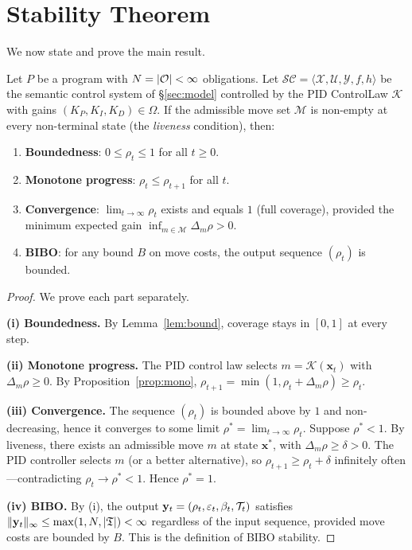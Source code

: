 \documentclass[11pt]{article}
\newcommand{\SC}{\mathcal{SC}}              %
\newcommand{\CL}{\mathcal{K}}              %
\newcommand{\xstate}{\mathbf{x}}           %
\newcommand{\yout}{\mathbf{y}}             %
\newcommand{\vcov}{\rho}                   %
\newcommand{\vgap}{\varepsilon}            %
\newcommand{\Kp}{K_P}                      %
\newcommand{\Ki}{K_I}                      %
\newcommand{\Kd}{K_D}                      %
\newcommand{\Xsp}{\mathcal{X}}            %
\newcommand{\Usp}{\mathcal{U}}            %
\newcommand{\Ysp}{\mathcal{Y}}            %
\newcommand{\obcount}{\beta}              %
\newcommand{\SCSys}{\langle \Xsp, \Usp, \Ysp, f, h \rangle}
\newcommand{\GainRegion}{\Omega}           %
\newcommand{\moves}{\mathcal{M}}           %
\begin{document}
\section{Stability Theorem}
\label{sec:theorem}

We now state and prove the main result.

\begin{theorem}
  \label{thm:bibo}
  Let $P$ be a program with $N = |\mathcal{O}| < \infty$ obligations.
  Let $\SC = \SCSys$ be the semantic control system of \S\ref{sec:model}
  controlled by the PID ControlLaw $\CL$ with gains
  $(\Kp, \Ki, \Kd) \in \GainRegion$.
  If the admissible move set $\moves$ is non-empty at every
  non-terminal state (the \emph{liveness} condition), then:
  \begin{enumerate}[label=(\roman*)]
    \item \textbf{Boundedness}: $0 \leq \vcov_t \leq 1$ for all $t \geq 0$.
    \item \textbf{Monotone progress}: $\vcov_t \leq \vcov_{t+1}$ for all $t$.
    \item \textbf{Convergence}: $\lim_{t \to \infty} \vcov_t$ exists
          and equals $1$ (full coverage), provided the minimum
          expected gain $\inf_{m \in \moves} \Delta_m\vcov > 0$.
    \item \textbf{BIBO}: for any bound $B$ on move costs,
          the output sequence $(\vcov_t)$ is bounded.
  \end{enumerate}
\end{theorem}

\begin{proof}
  We prove each part separately.

  \medskip\noindent
  \textbf{(i) Boundedness.}
  By Lemma~\ref{lem:bound}, coverage stays in $[0,1]$ at every step.

  \medskip\noindent
  \textbf{(ii) Monotone progress.}
  The PID control law selects $m = \CL(\xstate_t)$ with
  $\Delta_m\vcov \geq 0$.  By Proposition~\ref{prop:mono},
  $\vcov_{t+1} = \min(1, \vcov_t + \Delta_m\vcov) \geq \vcov_t$.

  \medskip\noindent
  \textbf{(iii) Convergence.}
  The sequence $(\vcov_t)$ is bounded above by $1$ and
  non-decreasing, hence it converges to some limit
  $\vcov^* = \lim_{t\to\infty}\vcov_t$.
  Suppose $\vcov^* < 1$.  By liveness, there exists an admissible
  move $m$ at state $\xstate^*$, with $\Delta_m\vcov \geq \delta > 0$.
  The PID controller selects $m$ (or a better alternative), so
  $\vcov_{t+1} \geq \vcov_t + \delta$ infinitely often---contradicting
  $\vcov_t \to \vcov^* < 1$.  Hence $\vcov^* = 1$.

  \medskip\noindent
  \textbf{(iv) BIBO.}
  By (i), the output $\yout_t = (\vcov_t, \vgap_t, \obcount_t, \trust_t)$
  satisfies
  $\|\yout_t\|_\infty \leq \max(1, N, |\Talg|) < \infty$
  regardless of the input sequence, provided move costs are bounded by $B$.
  This is the definition of BIBO stability.
\end{proof}
\end{document}
